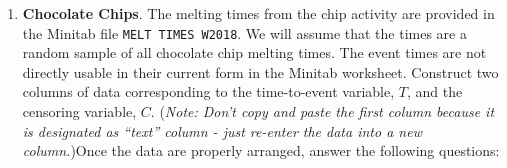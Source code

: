 





\vskip10pt
\begin{enumerate}


\item \textbf{Chocolate Chips}. The melting times from the chip activity are provided in the Minitab file \texttt{MELT TIMES W2018}.  We will assume that the times are a random sample of all chocolate chip melting times. The event times are not directly usable in their current form in the Minitab worksheet.  Construct two columns of data corresponding to the time-to-event variable, $T$, and the {censoring}  variable, $C$.  (\emph{Note: Don't copy and paste the first column because it is designated as ``text'' column - just re-enter the data into a new column.})Once the data are properly arranged, answer the following questions:


\end{enumerate}
